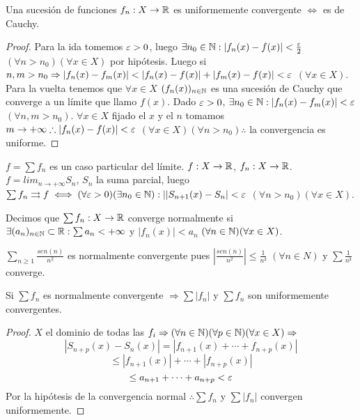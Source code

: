 \begin{theorem}
  Una sucesión de funciones $f_n : X \to \mathbb{R}$ es uniformemente convergente $\iff$ es de Cauchy.
  \begin{proof}
    Para la ida tomemos $\varepsilon > 0$, luego $\exists n_0 \in \mathbb{N} : |f_n(x) - f(x)| < \frac{\varepsilon}{2}$ $(\forall n > n_0)(\forall x \in X)$ por hipótesis. Luego si $n, m > n_0 \Rightarrow |f_n(x) - f_m(x)| < |f_n(x) - f(x)| + |f_m(x) - f(x)| < \varepsilon$ $(\forall x \in X)$. \\
    Para la vuelta tenemos que $\forall x \in X$ $(f_n(x))_{n \in \mathbb{N}}$ es una sucesión de Cauchy que converge a un límite que llamo $f(x)$. Dado $\varepsilon > 0$, $\exists n_0 \in \mathbb{N} : |f_n(x) - f_m(x)| < \varepsilon$ $(\forall n, m > n_0)$. $\forall x \in X$ fijado el $x$ y el $n$ tomamos $m \to +\infty \therefore |f_n(x) - f(x)| < \varepsilon$ $(\forall x \in X)(\forall n > n_0) \therefore$ la convergencia es uniforme. 
  \end{proof}
\end{theorem}

$f = \sum f_n$ es un caso particular del límite. $f : X \to \mathbb{R}$, $f_n: X \to \mathbb{R}$. $f = lim_{n \to +\infty} S_n$, $S_n$ la suma parcial, luego $\sum f_n \rightrightarrows f \iff (\forall \varepsilon > 0)(\exists n_0 \in \mathbb{N}) : ||S_{n+1}(x) - S_n| < \varepsilon$ $(\forall n > n_0)(\forall x \in X)$.

\begin{definition}
  Decimos que $\sum f_n: X \to \mathbb{R}$ converge normalmente si $\exists (a_n)_{n \in \mathbb{N}} \subset \mathbb{R} : \sum a_n < +\infty$ y $ |f_n(x)| < a_n$ $(\forall n \in \mathbb{N})(\forall x \in X)$.
\end{definition}

\begin{eg}
  $\sum_{n \geq 1} \frac{sen(n)}{n^2}$ es normalmente convergente pues $|\frac{sen(n)}{n^2}| \leq \frac{1}{n²}$ $(\forall n \in N)$ y $\sum \frac{1}{n²}$ converge.
\end{eg}

\begin{theorem}
  Si $\sum f_n$ es normalmente convergente $\Rightarrow \sum |f_n|$ y $\sum f_n$ son uniformemente convergentes.
  \begin{proof}
    $X$ el dominio de todas las $f_i \Rightarrow (\forall n \in \mathbb{N})(\forall p \in \mathbb{N})(\forall x \in X) \Rightarrow$ \begin{equation}
      |S_{n + p}(x) - S_n(x)| = |f_{n+1}(x) + \cdots + f_{n + p}(x)|
    \end{equation}
    \begin{equation}
      \leq |f_{n+1}(x)| + \cdots + |f_{n+p}(x)|
    \end{equation}
    \begin{equation}
      \leq a_{n+1} + \cdots + a_{n+p} < \varepsilon
    \end{equation}
    Por la hipótesis de la convergencia normal $\therefore \sum f_n$ y $\sum |f_n|$ convergen uniformemente.
  \end{proof}
\end{theorem}

